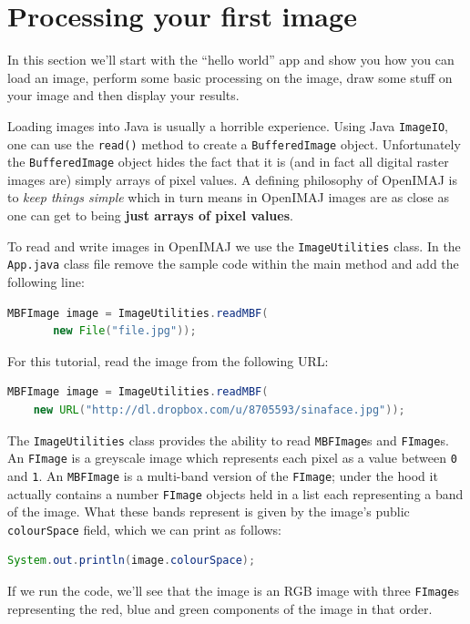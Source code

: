 \documentclass[10pt,a4paper,twoside,extrafontsizes]{memoir}
\begin{document}
\chapter{Processing your first image}
In this section we'll start with the ``hello world'' app and show you how you can load an image, 
perform some basic processing on the image, draw some stuff on your image and then display your 
results.

Loading images into Java is usually a horrible experience. Using Java \verb+ImageIO+, one can use the 
\verb+read()+ method to create a \verb+BufferedImage+ object. Unfortunately the \verb+BufferedImage+ 
object hides the fact that it is (and in fact all digital raster images are) simply arrays of pixel 
values. A defining philosophy of OpenIMAJ is to \emph{keep things simple} which in turn means in OpenIMAJ 
images are as close as one can get to being \textbf{just arrays of pixel values}.

To read and write images in OpenIMAJ we use the \verb+ImageUtilities+ class. In the \verb+App.java+ 
class file remove the sample code within the main method and add the following line:
\begin{lstlisting}[language=java]
MBFImage image = ImageUtilities.readMBF(
       new File("file.jpg"));
\end{lstlisting}
For this tutorial, read the image from the following URL:
\begin{lstlisting}[language=java]
MBFImage image = ImageUtilities.readMBF(
    new URL("http://dl.dropbox.com/u/8705593/sinaface.jpg"));
\end{lstlisting}
The \verb+ImageUtilities+ class provides the ability to read \verb+MBFImage+s and \verb+FImage+s. 
An \verb+FImage+ is a greyscale image which represents each pixel as a value between \verb+0+ and 
\verb+1+. An \verb+MBFImage+ is a multi-band version of the \verb+FImage+; under the hood it actually
contains a number \verb+FImage+ objects held in a list each representing a band of the image. 
What these bands represent is given by the image's public \verb+colourSpace+ field, which we 
can print as follows:
\begin{lstlisting}[language=java]
System.out.println(image.colourSpace);
\end{lstlisting}
If we run the code, we'll see that the image is an RGB image with three \verb+FImage+s representing 
the red, blue and green components of the image in that order.
\end{document}

